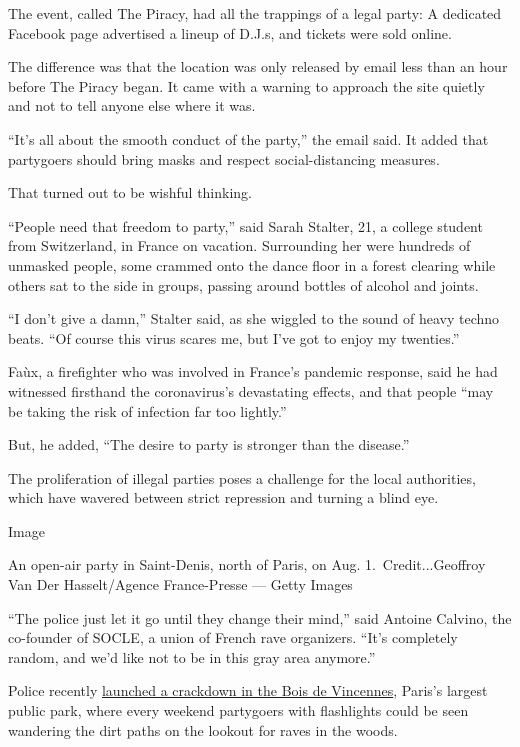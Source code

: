 The event, called The Piracy, had all the trappings of a legal party: A
dedicated Facebook page advertised a lineup of D.J.s, and tickets were
sold online.

The difference was that the location was only released by email less
than an hour before The Piracy began. It came with a warning to approach
the site quietly and not to tell anyone else where it was.

``It's all about the smooth conduct of the party,'' the email said. It
added that partygoers should bring masks and respect social-distancing
measures.

That turned out to be wishful thinking.

``People need that freedom to party,'' said Sarah Stalter, 21, a college
student from Switzerland, in France on vacation. Surrounding her were
hundreds of unmasked people, some crammed onto the dance floor in a
forest clearing while others sat to the side in groups, passing around
bottles of alcohol and joints.

``I don't give a damn,'' Stalter said, as she wiggled to the sound of
heavy techno beats. ``Of course this virus scares me, but I've got to
enjoy my twenties.''

Faùx, a firefighter who was involved in France's pandemic response, said
he had witnessed firsthand the coronavirus's devastating effects, and
that people ``may be taking the risk of infection far too lightly.''

But, he added, ``The desire to party is stronger than the disease.''

The proliferation of illegal parties poses a challenge for the local
authorities, which have wavered between strict repression and turning a
blind eye.

Image

An open-air party in Saint-Denis, north of Paris, on Aug.
1.~Credit...Geoffroy Van Der Hasselt/Agence France-Presse --- Getty
Images

``The police just let it go until they change their mind,'' said Antoine
Calvino, the co-founder of SOCLE, a union of French rave organizers.
``It's completely random, and we'd like not to be in this gray area
anymore.''

Police recently
\href{https://www.leparisien.fr/societe/coronavirus-faute-de-boites-de-nuit-c-est-le-regne-des-free-parties-11-07-2020-8351358.php}{launched
a crackdown in the Bois de Vincennes}, Paris's largest public park,
where every weekend partygoers with flashlights could be seen wandering
the dirt paths on the lookout for raves in the woods.

